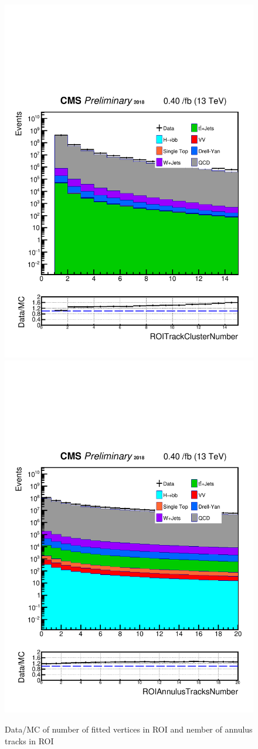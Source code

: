 \begin{figure}[h!]
  \caption{Data/MC of number of fitted vertices in ROI and nember of annulus tracks in ROI}
  \label{fig:2ROIs}
  \centering
  \includegraphics[width=0.47\linewidth]{figs/Data_AnalysisNoteplot_MS-15_ctauS-10_ROITrackClusterNumber.pdf}
  \includegraphics[width=0.47\linewidth]{figs/Data_AnalysisNoteplot_MS-15_ctauS-10_ROIAnnulusTracksNumber.pdf}
\end{figure}

